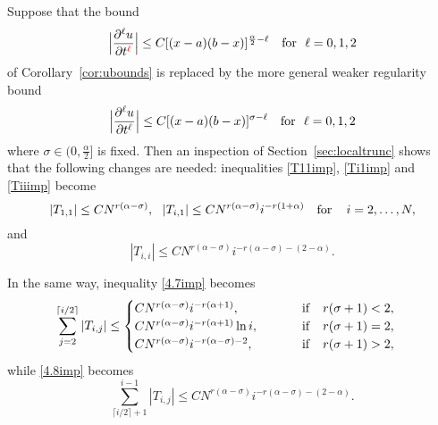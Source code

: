 \documentclass[smallextended]{svjour3}       %
\newcommand{\tcr}[1]{\textcolor{red}{#1}}
\begin{document}
\begin{remark}
	Suppose that the bound
	\begin{equation*}
		\Big|\frac{\partial^{\ell}u}{\partial t^{\tcr{\ell}}}\Big| \leq C [(x-a)(b-x)]^{\frac{\alpha}{2}-\ell}\quad	{\rm for}~~\ell=0,1,2
	\end{equation*}
	of Corollary~\ref{cor:ubounds} is replaced by the more general weaker regularity  bound
	\begin{equation*}%
		\Big|\frac{\partial^{\ell}u}{\partial t^{\ell}}\Big| \leq C [(x-a)(b-x)]^{\sigma-\ell}\quad	{\rm for}~~\ell=0,1,2
	\end{equation*}
	where $\sigma \in (0,\frac{\alpha}{2}]$ is fixed.
Then an inspection of Section~\ref{sec:localtrunc} shows that the following changes are needed: 
inequalities \eqref{T11imp}, \eqref{Ti1imp} and  \eqref{Tiiimp} become
	\begin{equation*}%
		|T_{1,1}| \leq C N^{r \left(\alpha-\sigma \right)},~~|T_{i,1}| \leq C N^{r \left(\alpha-\sigma \right)} i^{-r \left(1+\alpha\right)} \quad {\rm for}\quad \,i=2,\dots,N,
\end{equation*}
and\begin{equation*}
     |T_{i,i}|\le C N^{r \left(\alpha-\sigma \right)} i^{-r\left(\alpha-\sigma\right)-\left(2-\alpha\right)}.
   \end{equation*}

In the same way, inequality \eqref{4.7imp} becomes
\begin{align}%
		\sum_{j=2}^{\lceil i/2 \rceil}{\left| T_{i,j} \right|}
		&\le \begin{cases}
			C N^{r \left(\alpha-\sigma \right)} i^{-r(\alpha+1)},  &~~\qquad  {\rm if } \quad r(\sigma+1)<2, \\
			C N^{r \left(\alpha-\sigma \right)} i^{-r(\alpha+1)} \ln i, &~~\qquad  {\rm if } \quad r(\sigma+1)=2, \\
			C N^{r \left(\alpha-\sigma \right)} i^{-r(\alpha-\sigma)-2}, &~~\qquad  {\rm if } \quad r(\sigma+1)>2,
		\end{cases} 
	\end{align}
while  \eqref{4.8imp} becomes
	\begin{equation*}%
		\sum_{\lceil i/2\rceil+1}^{i-1} \left| T_{i,j}\right|
		\leq C N^{r \left(\alpha-\sigma \right)} i^{-r \left(\alpha-\sigma\right)-\left(2-\alpha\right)}.
	\end{equation*}


\end{remark}
\end{document}
